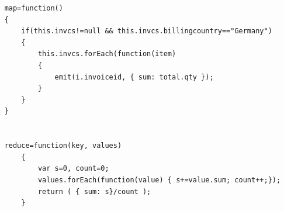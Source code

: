 \documentclass[10pt]{article}
\begin{document}
\begin{enumerate}
	\begin{lstlisting}
	map=function() 
	{ 
		if(this.invcs!=null && this.invcs.billingcountry=="Germany")
		{
			this.invcs.forEach(function(item) 
			{ 
				emit(i.invoiceid, { sum: total.qty }); 
			}
		}
	}
	
	
	reduce=function(key, values) 
		{
			var s=0, count=0;
			values.forEach(function(value) { s+=value.sum; count++;});
			return ( { sum: s}/count );
		}
	
	\end{lstlisting}
			
		
		
	\end{enumerate}
	
  
\end{document}
